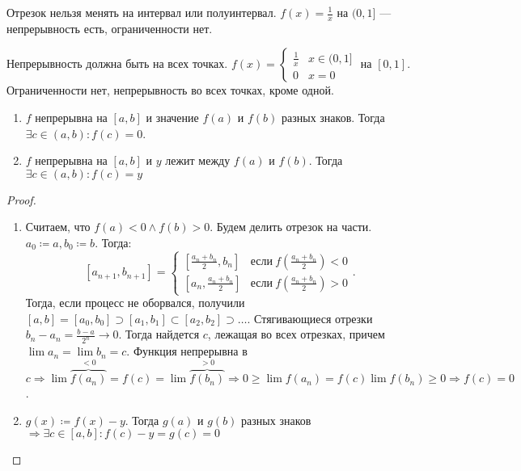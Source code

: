 \begin{remark}
    Отрезок нельзя менять на интервал или полуинтервал. $f(x) = \frac{1}{x}$ на $(0, 1]$ --- непрерывность есть, ограниченности нет.
\end{remark}
\begin{remark}
    Непрерывность должна быть на всех точках. $f(x) = \begin{cases} \frac{1}{x} & x \in (0, 1] \\ 0 & x = 0\end{cases}$ на $[0, 1]$. Ограниченности нет, непрерывность во всех точках, кроме одной. 
\end{remark}
\begin{theorem}
    \slashn
    \begin{enumerate}
        \item $f$ непрерывна на  $[a, b]$ и значение  $f(a)$ и  $f(b)$ разных знаков. Тогда  $\exists c \in (a, b)\!: f(c) = 0$.
        \item $f$ непрерывна на  $[a, b]$ и  $y$ лежит между  $f(a)$ и $f(b)$. Тогда  $\exists c \in (a, b)\!: f(c) = y$ 
    \end{enumerate}
\end{theorem}
\begin{proof}
    \slashn
    \begin{enumerate}
        \item Считаем, что $f(a) < 0 \land f(b) > 0$. Будем делить отрезок на части. $a_0 \coloneqq a, b_0 \coloneqq b$. Тогда: \[
        [a_{n+1}, b_{n+1}] = \begin{cases} 
            [\frac{a_n+b_n}{2}, b_n] & \text{если}\ f(\frac{a_n + b_n}{2}) < 0 \\
            [a_n, \frac{a_n+b_n}{2}] & \text{если}\ f(\frac{a_n + b_n}{2}) > 0
        \end{cases}
    .\] 
    Тогда, если процесс не оборвался, получили $[a, b] = [a_0,b_0] \supset [a_1, b_1] \subset [a_2, b_2] \supset \ldots$. Стягивающиеся отрезки $b_n - a_n = \frac{b-a}{2^n} \to 0$. Тогда найдется $c$, лежащая во всех отрезках, причем  $\lim a_n = \lim b_n = c$. Функция непрерывна в  $c \Rightarrow \lim \overbrace{f(a_n)}^{<0} = f(c) = \lim \overbrace{f(b_n)}^{>0} \Rightarrow 0 \ge \lim f(a_n) = f(c) \lim f(b_n) \ge 0 \Rightarrow f(c) = 0$.
\item $g(x) \coloneqq f(x) - y$. Тогда $g(a)$ и $g(b)$ разных знаков  $\Rightarrow \exists c \in [a, b]\!:f(c) - y = g(c) = 0$
        \end{enumerate}
\end{proof}
